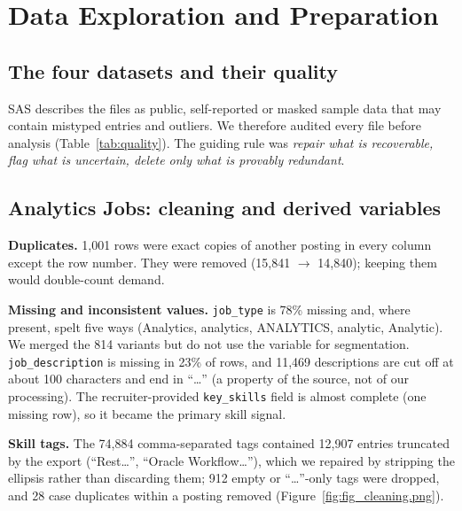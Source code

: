 \section{Data Exploration and Preparation}\label{sec:data}

\subsection{The four datasets and their quality}

SAS describes the files as public, self-reported or masked sample data that may contain mistyped
entries and outliers. We therefore audited every file before analysis (Table~\ref{tab:quality}).
The guiding rule was \emph{repair what is recoverable, flag what is uncertain, delete only what is
provably redundant}.

\begin{table}[H]\centering\scriptsize
\caption{Data-quality audit and actions for the four SAS files.}\label{tab:quality}

\end{table}

\subsection{Analytics Jobs: cleaning and derived variables}

\textbf{Duplicates.} 1,001 rows were exact copies of another posting in every column except the
row number. They were removed (15,841 $\rightarrow$ 14,840); keeping them would double-count demand.

\textbf{Missing and inconsistent values.} \texttt{job\_type} is 78\% missing and, where present,
spelt five ways (Analytics, analytics, ANALYTICS, analytic, Analytic). We merged the 814 variants
but do not use the variable for segmentation. \texttt{job\_description} is missing in 23\% of rows,
and 11,469 descriptions are cut off at about 100 characters and end in ``\ldots'' (a property of the
source, not of our processing). The recruiter-provided \texttt{key\_skills} field is almost complete
(one missing row), so it became the primary skill signal.

\textbf{Skill tags.} The 74,884 comma-separated tags contained 12,907 entries truncated by the
export (``Rest\ldots'', ``Oracle Workflow\ldots''), which we repaired by stripping the ellipsis rather
than discarding them; 912 empty or ``\ldots''-only tags were dropped, and 28 case duplicates within a
posting removed (Figure~\ref{fig:fig_cleaning.png}).

